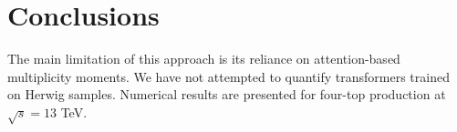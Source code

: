 \section{Conclusions}\label{sec:conclusions}

The main limitation of this approach is its reliance on attention-based
multiplicity moments. We have not attempted to quantify transformers
trained on Herwig samples. Numerical results are presented for four-top
production at $\sqrt{s} = 13$ TeV.

